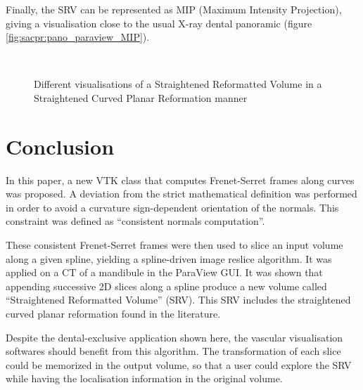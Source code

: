 \documentclass{InsightArticle}
\begin{document}
Finally, the SRV can be represented as MIP (Maximum Intensity Projection), 
giving a visualisation close to the usual X-ray dental panoramic
(figure \ref{fig:sacpr:pano_paraview_MIP}).
%
\begin{figure}
\centering
{}\\
\caption{Different visualisations of a Straightened Reformatted Volume in a
Straightened Curved Planar Reformation manner}
\label{fig:sacpr}
\end{figure}
%
%
\section{Conclusion}
%
In this paper, a new VTK class that computes Frenet-Serret frames along curves
was proposed. A deviation from the strict mathematical definition was performed
in order to avoid a curvature sign-dependent orientation of the normals. This
constraint was defined as ``consistent normals computation''.

These consistent Frenet-Serret frames were then used to slice an input volume
along a given spline, yielding a spline-driven image reslice algorithm. It was
applied on a CT of a mandibule in the ParaView GUI. It was shown that appending
successive 2D slices along a spline produce a new volume called ``Straightened
Reformatted Volume'' (SRV). This SRV includes the straightened curved planar
reformation found in the literature.

Despite the dental-exclusive application shown here, the vascular visualisation
softwares should benefit from this algorithm. The transformation of each slice
could be memorized in the output volume, so that a user could explore the SRV
while having the localisation information in the original volume.
%
\appendix
%
\end{document}
